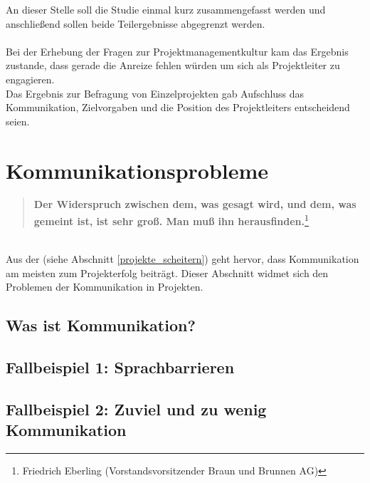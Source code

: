 \documentclass[12pt]{scrartcl}
\begin{document}
An dieser Stelle soll die Studie einmal kurz zusammengefasst werden und anschließend sollen beide Teilergebnisse abgegrenzt werden. \\
\\
Bei der Erhebung der Fragen zur Projektmanagementkultur kam das Ergebnis zustande, dass gerade die Anreize fehlen würden um sich als Projektleiter zu engagieren. \\
Das Ergebnis zur Befragung von Einzelprojekten gab Aufschluss das Kommunikation, Zielvorgaben und die Position des Projektleiters entscheidend seien.

\pagebreak
\section{Kommunikationsprobleme}
\label{kommunikationsprobleme}
\begin{quote}
\colorbox{blue!5}{\textbf{Der Widerspruch zwischen dem, was gesagt wird, und dem, was gemeint ist, ist sehr groß. Man muß ihn herausfinden.}}\footnote{Friedrich Eberling (Vorstandsvorsitzender Braun und Brunnen AG)}
\end{quote}
\ \\
Aus der \cite{GPM_Studie_2008} (siehe Abschnitt \ref{projekte_scheitern}) geht hervor, dass Kommunikation am meisten zum Projekterfolg beiträgt. Dieser Abschnitt widmet sich den Problemen der Kommunikation in Projekten. 

\subsection{Was ist Kommunikation?}

\subsection{Fallbeispiel 1: Sprachbarrieren}

\subsection{Fallbeispiel 2: Zuviel und zu wenig Kommunikation}


\cite{profPM}
\cite{scriptPM}
\cite{chaosReportCriteria}
\end{document}
